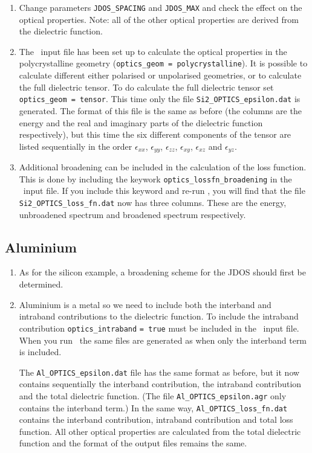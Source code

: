 \documentclass[a4paper,11pt,twoside]{book}
\begin{document}
{\begin{enumerate}
\item Change parameters \verb#JDOS_SPACING# and \verb#JDOS_MAX# and check the effect on the optical properties.  Note: all of the other optical properties are derived from the dielectric function.  

\item  The \optados\ input file has been set up to calculate the optical properties in the polycrystalline geometry (\verb#optics_geom = polycrystalline#).  It is possible to calculate different either polarised or unpolarised geometries, or to calculate the full dielectric tensor.  To do calculate the full dielectric tensor set \verb#optics_geom = tensor#.  This time only the file \verb#Si2_OPTICS_epsilon.dat# is generated.  The format of this file is the same as before (the columns are the energy and the real and imaginary parts of the dielectric function respectively), but this time the six different components of the tensor are listed sequentially in the order $\epsilon_{xx}$, $\epsilon_{yy}$, $\epsilon_{zz}$, $\epsilon_{xy}$, $\epsilon_{xz}$ and $\epsilon_{yz}$.

\item Additional broadening can be included in the calculation of the loss function.  This is done by including the keywork \verb#optics_lossfn_broadening# in the \optados\ input file.  If you include this keyword and re-run \optados, you will find that the file \verb#Si2_OPTICS_loss_fn.dat# now has three columns.  These are the energy, unbroadened spectrum and broadened spectrum respectively.  

\end{enumerate}

\subsection{Aluminium}
\begin{enumerate}
\item As for the silicon example, a broadening scheme for the JDOS should first be determined.  
\item Aluminium is a metal so we need to include both the interband and intraband contributions to the dielectric function.  To include the intraband contribution \verb#optics_intraband# \verb#= true# must be included in the \optados\ input file.  When you run \optados\, the same files are generated as when only the interband term is included.  

The \verb#Al_OPTICS_epsilon.dat# file has the same format as before, but it now contains sequentially the interband contribution, the intraband contribution and the total dielectric function.  (The file \verb#Al_OPTICS_epsilon.agr# only contains the interband term.)  In the same way, \verb#Al_OPTICS_loss_fn.dat# contains the interband contribution, intraband contribution and total loss function.  All other optical properties are calculated from the total dielectric function and the format of the output files remains the same.


\end{enumerate}}
\end{document}

